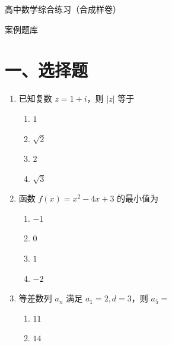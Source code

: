 \documentclass[UTF8,a4paper]{ctexart}
\begin{document}
\begin{center}
{\LARGE 高中数学综合练习（合成样卷）\par}
\medskip
{\large 案例题库}
\end{center}
\vspace{1em}

\section*{一、选择题}


\begin{enumerate}[leftmargin=2em,itemsep=0.8em]


\item 已知复数 $z=1+i$，则 $|z|$ 等于

\begin{enumerate}[label=\Alph*.,itemsep=0.2em,parsep=0pt]

\item $1$

\item $\sqrt{2}$

\item $2$

\item $\sqrt{3}$

\end{enumerate}




\item 函数 $f(x)=x^2-4x+3$ 的最小值为

\begin{enumerate}[label=\Alph*.,itemsep=0.2em,parsep=0pt]

\item $-1$

\item $0$

\item $1$

\item $-2$

\end{enumerate}




\item 等差数列 $a_n$ 满足 $a_1=2, d=3$，则 $a_5=$

\begin{enumerate}[label=\Alph*.,itemsep=0.2em,parsep=0pt]

\item $11$

\item $14$


\end{enumerate}
\end{enumerate}
\end{document}

